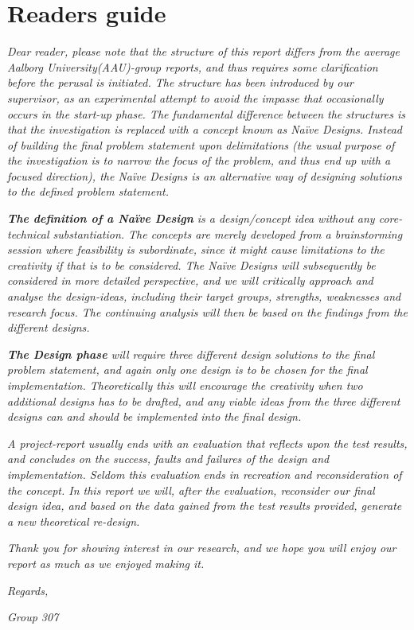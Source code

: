\section*{Readers guide}
\textit{Dear reader, please note that the structure of this report differs from the average Aalborg University(AAU)-group reports, and thus requires some clarification before the perusal is initiated. 
The structure has been introduced by our supervisor, as an experimental attempt to avoid the impasse that occasionally occurs in the start-up phase.
The fundamental difference between the structures is that the investigation is replaced with a concept known as Naïve Designs. Instead of building the final problem statement upon delimitations (the usual purpose of the investigation is to narrow the focus of the problem, and thus end up with a focused direction), the Naïve Designs is an alternative way of designing solutions to the defined problem statement.}
\bigskip

\textit{\textbf{The definition of a Naïve Design} is a design/concept idea without any core-technical substantiation. 
The concepts are merely developed from a brainstorming session where feasibility is subordinate, since it might cause limitations to the creativity if that is to be considered.	
The Naïve Designs will subsequently be considered in more detailed perspective, and we will critically approach and analyse the design-ideas, including their target groups, strengths, weaknesses and research focus. The continuing analysis will then be based on the findings from the different designs.}
\bigskip

\textit{\textbf{The Design phase} will require three different design solutions to the final problem statement, and again only one design is to be chosen for the final implementation. 
Theoretically this will encourage the creativity when two additional designs has to be drafted, and any viable ideas from the three different designs can and should be implemented into the final design.}
\bigskip

\textit{A project-report usually ends with an evaluation that reflects upon the test results, and concludes on the success, faults and failures of the design and implementation. 
Seldom this evaluation ends in recreation and reconsideration of the concept. 
In this report we will, after the evaluation, reconsider our final design idea, and based on the data gained from the test results provided, generate a new theoretical re-design.}
\bigskip

\textit{Thank you for showing interest in our research, and we hope you will enjoy our report as much as we enjoyed making it.}
\bigskip

\noindent\textit{Regards,}

\noindent\textit{Group 307}